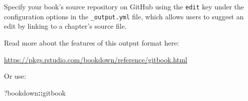 \documentclass[
]{book}
\newenvironment{Shaded}{\begin{snugshade}}{\end{snugshade}}
\newcommand{\NormalTok}[1]{#1}
\newcommand{\SpecialCharTok}[1]{\textcolor[rgb]{0.81,0.36,0.00}{\textbf{#1}}}
\theoremstyle{definition}
\theoremstyle{definition}
\theoremstyle{definition}
\theoremstyle{definition}
\theoremstyle{remark}
\begin{document}
Specify your book's source repository on GitHub using the \texttt{edit} key under the configuration options in the \texttt{\_output.yml} file, which allows users to suggest an edit by linking to a chapter's source file.

Read more about the features of this output format here:

\url{https://pkgs.rstudio.com/bookdown/reference/gitbook.html}

Or use:

\begin{Shaded}
\begin{Highlighting}[]
\NormalTok{?bookdown}\SpecialCharTok{::}\NormalTok{gitbook}
\end{Highlighting}
\end{Shaded}


  
\end{document}
